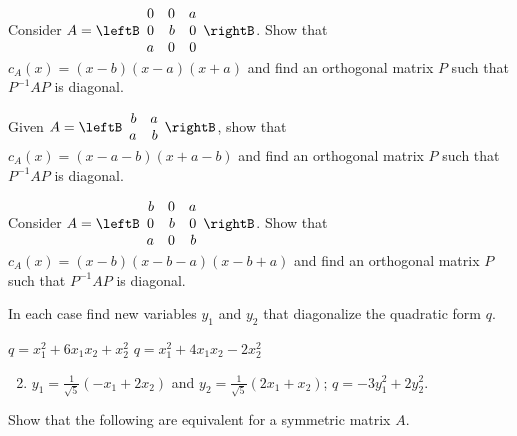 \begin{multicols}{2}
\begin{ex}
Consider $A = \leftB \begin{array}{rrr}
0 & 0 & a \\
0 & b & 0 \\
a & 0 & 0 
\end{array}\rightB$. Show that $c_{A}(x) = (x - b)(x - a)(x + a)$ and find an orthogonal matrix $P$ such that $P^{-1}AP$ is diagonal.
\end{ex}

\begin{ex}
Given $A = \leftB \begin{array}{rr}
b & a \\
a & b
\end{array}\rightB$, show that \\ $c_{A}(x) = (x - a - b)(x + a - b)$ and find an orthogonal matrix $P$ such that $P^{-1}AP$ is diagonal.
\end{ex}

\begin{ex}
Consider $A = \leftB \begin{array}{rrr}
b & 0 & a \\
0 & b & 0 \\
a & 0 & b 
\end{array}\rightB$. Show that $c_{A}(x) = (x - b)(x - b - a)(x - b + a)$ and find an orthogonal matrix $P$ such that $P^{-1}AP$ is diagonal.
\end{ex}

\begin{ex}
In each case find new variables $y_{1}$ and $y_{2}$ that diagonalize the quadratic form $q$.

\begin{exenumerate}
\exitem $q = x_{1}^2 + 6x_{1}x_2 + x_{2}^2$
\exitem $q = x_{1}^2 + 4x_{1}x_2 - 2x_{2}^2$
\end{exenumerate}
\begin{sol}
\begin{enumerate}[label={\alph*.}]
\setcounter{enumi}{1}
\item  $y_{1} = \frac{1}{\sqrt{5}}(-x_{1} + 2x_{2})$ and $y_{2} = \frac{1}{\sqrt{5}}(2x_{1} + x_{2})$; $q = -3y_{1}^2 + 2y_{2}^2$.


\end{enumerate}
\end{sol}
\end{ex}

\begin{ex}
Show that the following are equivalent for a symmetric matrix $A$.



\end{ex}
\end{multicols}
